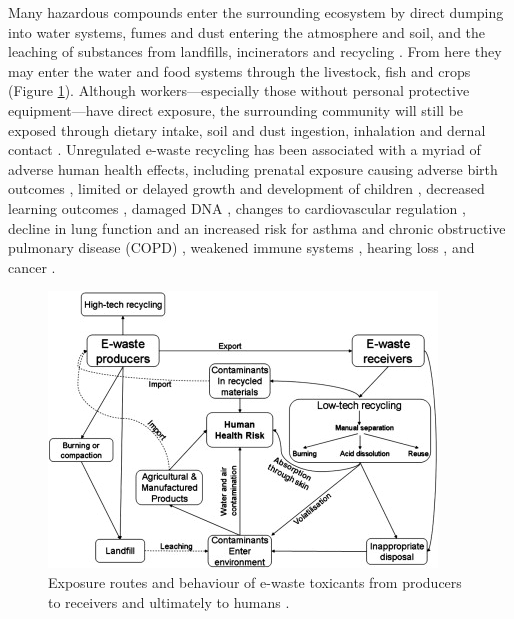 \documentclass{article}
\begin{document}
Many hazardous compounds enter the surrounding ecosystem by direct dumping into water systems, fumes and dust entering the atmosphere and soil, and the leaching of substances from landfills, incinerators and recycling \cite{williams2011environmental}. From here they may enter the water and food systems through the livestock, fish and crops (Figure \ref{e-waste_ecosystem_contamination}). Although workers---especially those without personal protective equipment---have direct exposure, the surrounding community will still be exposed through dietary intake, soil and dust ingestion, inhalation and dernal contact  \cite{williams2011environmental, chan2013review}. Unregulated e-waste recycling has been associated with a myriad of adverse human health effects, including prenatal exposure causing adverse birth outcomes \cite{xu2012birth}, limited or delayed growth and development of children \cite{liu2018thyroid}, decreased learning outcomes \cite{soetrisno2020chronic}, damaged DNA \cite{alabi2012comparative}, changes to cardiovascular regulation \cite{cong2018elevated}, decline in lung function and an increased risk for asthma and chronic obstructive pulmonary disease (COPD) \cite{amoabeng2020effect}, weakened immune systems \cite{zhang2017alteration}, hearing loss \cite{xu2020hearing}, and cancer \cite{davis2019strong}.

\begin{figure}[h]
    \includegraphics[width=.8 \textwidth]{./images/e-waste_ecosystem_contamination.jpg}
    \centering
    \caption{Exposure routes and behaviour of e-waste toxicants from producers to receivers and ultimately to humans \cite{robinson2009waste}.}
    \label{e-waste_ecosystem_contamination}
\end{figure}
\end{document}
